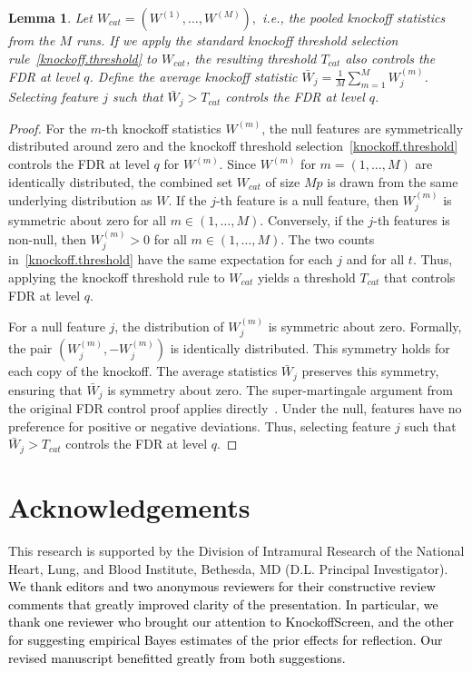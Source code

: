 \documentclass[12pt,Times]{article}
\def\cite{\citep}
\def\tcb{\textcolor{black}}
\newtheorem{lemma}[theorem]{Lemma}
\begin{document}
\begin{lemma} \label{lem:threshold}
Let $W_{cat} =  (W^{(1)}, \dots, W^{(M)}),$ i.e., the pooled knockoff statistics from the $M$ runs. If we apply the standard knockoff threshold selection rule~\eqref{knockoff.threshold} to $W_{cat}$, the resulting threshold $T_{cat}$ also controls the FDR at level $q$. 
Define the average knockoff statistic $\bar{W}_j = \frac{1}{M} \sum_{m=1}^M W^{(m)}_j$. 
Selecting feature $j$ such that $ \bar{W}_j > T_{cat}$ controls the FDR at level $q$.  
\end{lemma}

\begin{proof}
For the $m$-th knockoff statistics $W^{(m)}$, the null features are symmetrically distributed around zero and the knockoff threshold selection~\ref{knockoff.threshold} controls the FDR at level $q$ for $W^{(m)}$. Since $W^{(m)}$ for $m=(1,\dots, M)$ are identically distributed, the combined set $W_{cat}$ of size $Mp$ is drawn from the same underlying distribution as $W$.  
If the $j$-th feature is a null feature, then $W^{(m)}_j$ is symmetric about zero for all $m \in (1,\dots, M)$.  Conversely, if the $j$-th features is non-null, then $W^{(m)}_j > 0$ for all $m \in (1,\dots, M)$. The two counts in~\eqref{knockoff.threshold} have the same expectation for each $j$ and for all $t$. Thus, applying the knockoff threshold rule to $W_{cat}$ yields a threshold $T_{cat}$ that controls FDR at level $q$.

For a null feature $j$, the distribution of $W^{(m)}_j$ is symmetric about zero. Formally, the pair $(W^{(m)}_j, -W^{(m)}_j)$ is identically distributed. This symmetry holds for each copy of the knockoff. The average statistics $\bar{W}_j$ preserves this symmetry, ensuring that $\bar{W}_j$ is symmetry about zero. The super-martingale argument from the original FDR control proof applies directly~\cite[supplementary material of][]{barber.candes.15}. Under the null, features have no preference for positive or negative deviations. Thus, selecting feature $j$ such that $ \bar{W}_j > T_{cat}$ controls the FDR at level $q$.
\end{proof}




\section{Acknowledgements}
This research is supported by the Division of Intramural Research of the National Heart, Lung, and Blood Institute, Bethesda, MD (D.L. Principal Investigator).  
\tcb{We thank editors and two anonymous reviewers for their constructive review comments that greatly improved clarity of the presentation. In particular, we thank one reviewer who brought our attention to KnockoffScreen, and the other for suggesting empirical Bayes estimates of the prior effects for reflection.   Our revised manuscript benefitted greatly from both suggestions.} 
\end{document}
